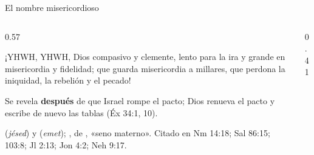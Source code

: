 \begin{frame}{El nombre misericordioso}
\begin{columns}[c,onlytextwidth]
\begin{column}{0.57\textwidth}
\begin{cita}¡YHWH, YHWH, Dios compasivo y clemente, lento para la ira y grande en misericordia y fidelidad; que guarda misericordia a millares, que perdona la iniquidad, la rebelión y el pecado!\end{cita}
\begin{clave}Se revela \textbf{después} de que Israel rompe el pacto; Dios renueva el pacto y escribe de nuevo las tablas (Éx 34:1, 10).\end{clave}
\begin{notalam}
 (\emph{jésed}) y  (\emph{emet}); , de , «seno materno». Citado en Nm 14:18; Sal 86:15; 103:8; Jl 2:13; Jon 4:2; Neh 9:17.
\end{notalam}
\end{column}
\begin{column}{0.41\textwidth}\end{column}
\end{columns}
\end{frame}

